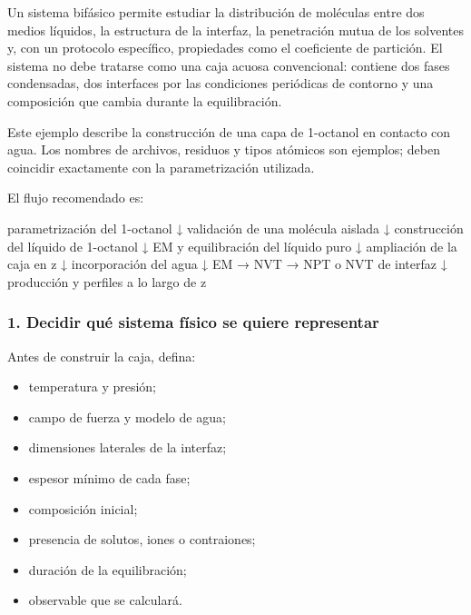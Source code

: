 \documentclass[
  spanish,
  11pt,
  a4paper]{article}
\newenvironment{Shaded}{\begin{snugshade}}{\end{snugshade}}
\newcommand{\NormalTok}[1]{#1}
\providecommand{\tightlist}{%
  \setlength{\itemsep}{0pt}\setlength{\parskip}{0pt}}
\begin{document}
Un sistema bifásico permite estudiar la distribución de moléculas entre
dos medios líquidos, la estructura de la interfaz, la penetración mutua
de los solventes y, con un protocolo específico, propiedades como el
coeficiente de partición. El sistema no debe tratarse como una caja
acuosa convencional: contiene dos fases condensadas, dos interfaces por
las condiciones periódicas de contorno y una composición que cambia
durante la equilibración.

Este ejemplo describe la construcción de una capa de 1-octanol en
contacto con agua. Los nombres de archivos, residuos y tipos atómicos
son ejemplos; deben coincidir exactamente con la parametrización
utilizada.

El flujo recomendado es:

\begin{Shaded}
\begin{Highlighting}[]
\NormalTok{parametrización del 1{-}octanol}
\NormalTok{    ↓}
\NormalTok{validación de una molécula aislada}
\NormalTok{    ↓}
\NormalTok{construcción del líquido de 1{-}octanol}
\NormalTok{    ↓}
\NormalTok{EM y equilibración del líquido puro}
\NormalTok{    ↓}
\NormalTok{ampliación de la caja en z}
\NormalTok{    ↓}
\NormalTok{incorporación del agua}
\NormalTok{    ↓}
\NormalTok{EM → NVT → NPT o NVT de interfaz}
\NormalTok{    ↓}
\NormalTok{producción y perfiles a lo largo de z}
\end{Highlighting}
\end{Shaded}

\subsubsection{1. Decidir qué sistema físico se quiere
representar}\label{decidir-quuxe9-sistema-fuxedsico-se-quiere-representar}

Antes de construir la caja, defina:

\begin{itemize}
\tightlist
\item
  temperatura y presión;
\item
  campo de fuerza y modelo de agua;
\item
  dimensiones laterales de la interfaz;
\item
  espesor mínimo de cada fase;
\item
  composición inicial;
\item
  presencia de solutos, iones o contraiones;
\item
  duración de la equilibración;
\item
  observable que se calculará.
\end{itemize}
\end{document}
